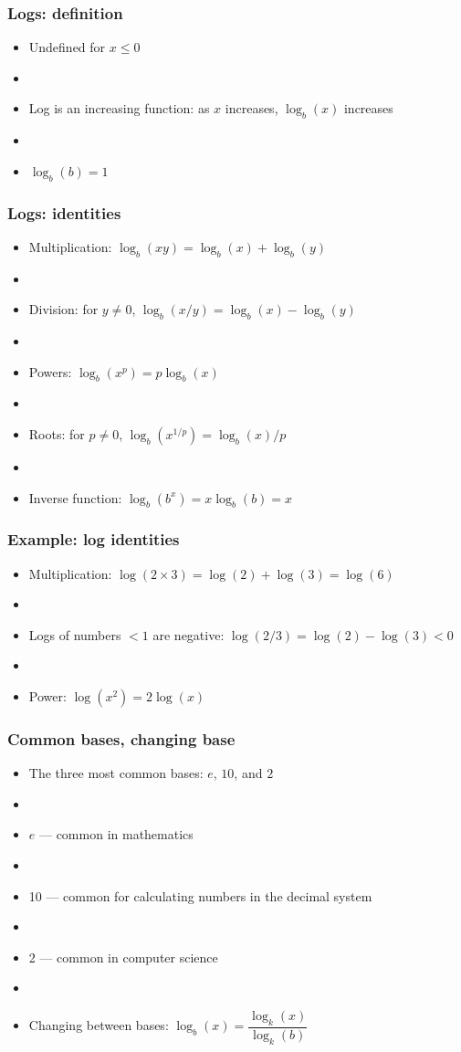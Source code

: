 \documentclass[12pt]{beamer}
\newcommand{\myframe}[1]{\begin{frame} \frametitle{#1}}
\begin{document}
\myframe{Logs: definition}
\begin{itemize}
\item Undefined for $x \leq 0$
\item[]
\item Log is an increasing function: as $x$ increases, $\log_b(x)$  increases
\item[]
\item $\log_b(b) = 1$
\end{itemize}
\end{frame}

\myframe{Logs: identities}
\begin{itemize}
\item Multiplication: $\log_b(xy) = \log_b(x) + \log_b(y)$
\item[]
\item Division: for $y \neq 0$, $\log_b(x/y) = \log_b(x) - \log_b(y)$
\item[]
\item Powers: $\log_b(x^p) = p \log_b(x)$
\item[]
\item Roots: for $p \neq 0$, $\log_b(x^{1/p}) = \log_b(x)/p$
\item[]
\item Inverse function: $\log_b(b^x) = x\log_b(b) = x$
\end{itemize}
\end{frame}

\myframe{Example: log identities}
\begin{itemize}
\item Multiplication: $\log (2 \times 3) = \log (2) + \log (3) = \log (6)$
\item[]
\item Logs of numbers $< 1$ are negative: $\log (2/3) = \log (2) - \log (3) < 0$
\item[]
\item Power: $\log (x^2) = 2\log (x)$
\end{itemize}
\end{frame}

\myframe{Common bases, changing base}
\begin{itemize}
\item The three most common bases: $e$, $10$, and $2$
\item[]
\item $e$ --- common in mathematics
\item[]
\item 10 --- common for calculating numbers in the decimal system
\item[]
\item 2 --- common in computer science
\item[]
\item Changing between bases: $\log_b(x) = \dfrac{\log_k(x)}{\log_k(b)}$
\end{itemize}
\end{frame}
\end{document}
